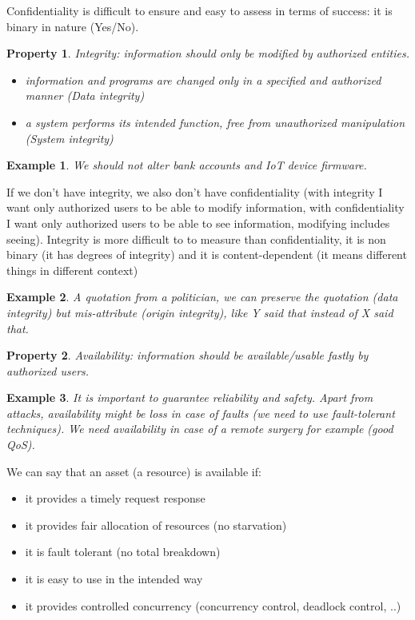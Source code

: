 \documentclass[a4paper, 12pt]{report}
\newtheorem{property}{\textbf{Property}}
\newtheorem{example}{\textbf{Example}}
\begin{document}
Confidentiality is difficult to ensure and easy to assess in terms of success: it is binary in nature (Yes/No).
\vspace{5mm}
\begin{property}
	Integrity: information should only be modified by authorized entities.
	\begin{itemize}
		\item information and programs are changed only in a specified and authorized manner (Data integrity)
		\item a system performs its intended function, free from unauthorized manipulation (System integrity)
	\end{itemize}
\end{property}
\begin{example}
	We should not alter bank accounts and IoT device firmware.
\end{example}
If we don't have integrity, we also don't have confidentiality (with integrity I want only authorized users to be able to modify information, with confidentiality I want only authorized users to be able to see information, modifying includes seeing).
Integrity is more difficult to to measure than confidentiality, it is non binary (it has degrees of integrity) and it is content-dependent (it means different things in different context)
\begin{example}
	A quotation from a politician, we can preserve the quotation (data integrity) but mis-attribute (origin integrity), like \textit{Y said that} instead of \textit{X said that}. 
\end{example}
\vspace{5mm}
\begin{property}
	Availability: information should be available/usable fastly by authorized users.
\end{property}
\begin{example}
	It is important to guarantee reliability and safety. Apart from attacks, availability might be loss in case of faults (we need to use fault-tolerant techniques). We need availability in case of a remote surgery for example (good QoS).
\end{example}
We can say that an asset (a resource) is available if:
\begin{itemize}
	\item it provides a timely request response
	\item it provides fair allocation of resources (no starvation)
	\item it is fault tolerant (no total breakdown)
	\item it is easy to use in the intended way
	\item it provides controlled concurrency (concurrency control, deadlock control, ..)
\end{itemize}
\end{document}
